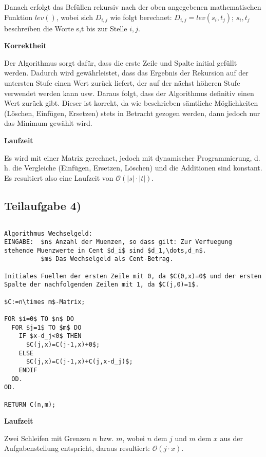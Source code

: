 \documentclass[a4paper, fontsize=10pt]{scrartcl}
\begin{document}
Danach erfolgt das Befüllen rekursiv nach der oben angegebenen mathematischen Funktion $lev()$, wobei sich $D_{i,j}$ wie folgt berechnet:
$D_{i,j}=lev(s_{i},t_{j})$; $s_{i}, t_{j}$ beschreiben die Worte s,t bis zur Stelle $i,j$. \bigskip

\textbf{Korrektheit}\smallskip

Der Algorithmus sorgt dafür, dass die erste Zeile und Spalte initial gefüllt werden. Dadurch wird gewährleistet, dass das Ergebnis der Rekursion auf der untersten Stufe einen Wert zurück liefert, der auf der nächst höheren Stufe verwendet werden kann usw. Daraus folgt, dass der Algorithmus definitiv einen Wert zurück gibt. Dieser ist korrekt, da wie beschrieben sämtliche Möglichkeiten (Löschen, Einfügen, Ersetzen) stets in Betracht gezogen werden, dann jedoch nur das Minimum gewählt wird.\bigskip

\textbf{Laufzeit}\smallskip

Es wird mit einer Matrix gerechnet, jedoch mit dynamischer Programmierung, d. h. die Vergleiche (Einfügen, Ersetzen, Löschen) und die Additionen sind konstant. Es resultiert also eine Laufzeit von $\mathcal{O}(|s|\cdot|t|)$.

\subsection*{Teilaufgabe 4)}
\begin{lstlisting}

\end{lstlisting}


\begin{lstlisting}[mathescape]
Algorithmus Wechselgeld:
EINGABE:  $n$ Anzahl der Muenzen, so dass gilt: Zur Verfuegung stehende Muenzwerte in Cent $d_i$ sind $d_1,\dots,d_n$.
          $m$ Das Wechselgeld als Cent-Betrag.
          
Initiales Fuellen der ersten Zeile mit 0, da $C(0,x)=0$ und der ersten Spalte der nachfolgenden Zeilen mit 1, da $C(j,0)=1$.

$C:=n\times m$-Matrix;

FOR $i=0$ TO $n$ DO
  FOR $j=1$ TO $m$ DO
    IF $x-d_j<0$ THEN
      $C(j,x)=C(j-1,x)+0$;
    ELSE
      $C(j,x)=C(j-1,x)+C(j,x-d_j)$;
    ENDIF
  OD.
OD.

RETURN C(n,m);

\end{lstlisting}
\bigskip

\textbf{Laufzeit}

Zwei Schleifen mit Grenzen $n$ bzw. $m$, wobei $n$ dem $j$ und $m$ dem $x$ aus der Aufgabenstellung entspricht, daraus resultiert: $\mathcal{O}(j\cdot x)$.
\end{document}
